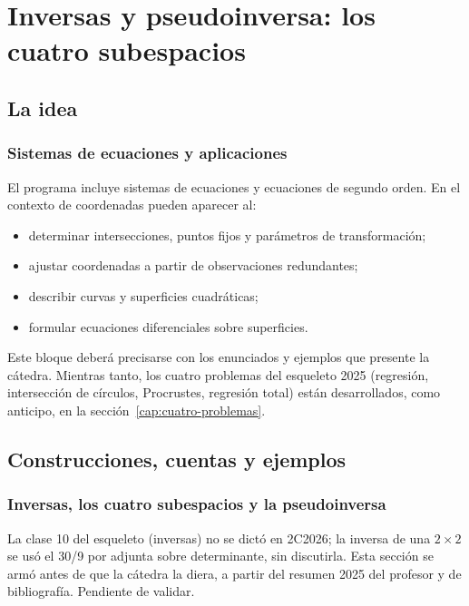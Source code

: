 \chapter{Inversas y pseudoinversa: los cuatro subespacios}\label{cap:inversas}

\section{La idea}

\subsection{Sistemas de ecuaciones y aplicaciones}\label{sec:sistemas-ecuaciones}

El programa incluye sistemas de ecuaciones y ecuaciones de segundo orden. En el contexto de
coordenadas pueden aparecer al:
\begin{itemize}
  \item determinar intersecciones, puntos fijos y parámetros de transformación;
  \item ajustar coordenadas a partir de observaciones redundantes;
  \item describir curvas y superficies cuadráticas;
  \item formular ecuaciones diferenciales sobre superficies.
\end{itemize}

Este bloque deberá precisarse con los enunciados y ejemplos que presente la cátedra. Mientras tanto, los cuatro problemas del esqueleto 2025 (regresión, intersección de círculos, Procrustes, regresión total) están desarrollados, como anticipo, en la sección~\ref{cap:cuatro-problemas}.

\section{Construcciones, cuentas y ejemplos}

\subsection{Inversas, los cuatro subespacios y la pseudoinversa}\label{sec:pseudoinversa}

\begin{atencion}[Anticipado]
La clase 10 del esqueleto (inversas) no se dictó en 2C2026; la inversa de una \(2\times2\)
se usó el 30/9 por adjunta sobre determinante, sin discutirla. Esta sección se armó antes
de que la cátedra la diera, a partir del resumen 2025 del profesor y de bibliografía.
Pendiente de validar.
\end{atencion}

